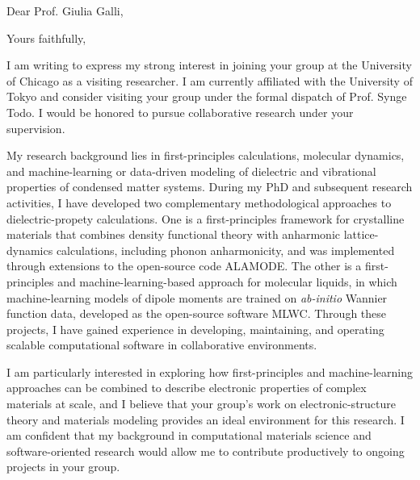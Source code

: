 \documentclass[11pt,a4paper,sans,colorlinks,lualatex,article]{moderncv}        %
\begin{document}
\hypersetup{
    colorlinks = true,
    linkcolor = blue,
    urlcolor  = blue,
    citecolor = blue,
    anchorcolor = blue,
    citebordercolor=green,
    linkbordercolor=red,
    urlbordercolor=cyan,
    filecolor=magenta,      
   }

\date{April 28, 2025}
\opening{Dear Prof. Giulia Galli,}
\closing{Yours faithfully,}
\makelettertitle

I am writing to express my strong interest in joining your group at the University of Chicago as a visiting researcher. I am currently affiliated with the University of Tokyo and consider visiting your group under the formal dispatch of Prof. Synge Todo. I would be honored to pursue collaborative research under your supervision.

My research background lies in first-principles calculations, molecular dynamics, and machine-learning or data-driven modeling of dielectric and vibrational properties of condensed matter systems. During my PhD and subsequent research activities, I have developed two complementary methodological approaches to dielectric-propety calculations. One is a first-principles framework for crystalline materials that combines density functional theory with anharmonic lattice-dynamics calculations, including phonon anharmonicity, and was implemented through extensions to the open-source code ALAMODE. The other is a first-principles and machine-learning-based approach for molecular liquids, in which machine-learning models of dipole moments are trained on \textit{ab-initio} Wannier function data, developed as the open-source software MLWC. Through these projects, I have gained experience in developing, maintaining, and operating scalable computational software in collaborative environments.

I am particularly interested in exploring how first-principles and machine-learning approaches can be combined to describe electronic properties of complex materials at scale, and I believe that your group’s work on electronic-structure theory and materials modeling provides an ideal environment for this research. I am confident that my background in computational materials science and software-oriented research would allow me to contribute productively to ongoing projects in your group.
\end{document}
